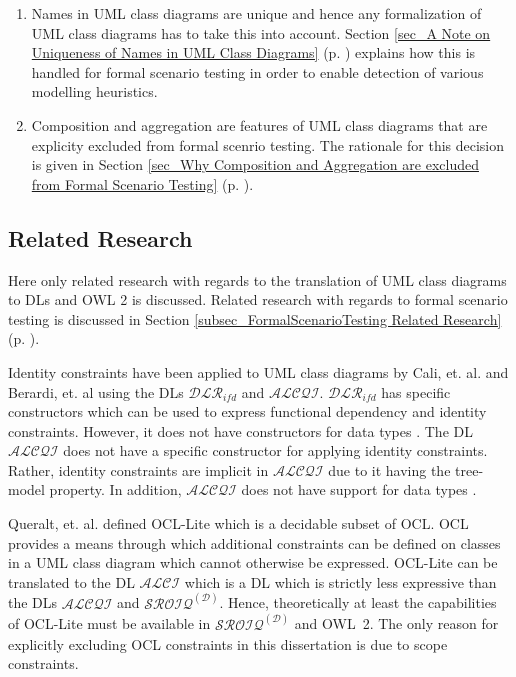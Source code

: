 \begin{enumerate}
 \item Names in UML class diagrams are unique and hence any formalization of UML class diagrams has to take this into account. Section \ref{sec_A Note on Uniqueness of Names in UML Class Diagrams} 
 (p. \pageref{sec_A Note on Uniqueness of Names in UML Class Diagrams}) explains how this is handled for formal scenario testing in order to enable detection of various modelling 
 heuristics.
 \item Composition and aggregation are features of UML class diagrams that are explicity excluded from formal scenrio testing. The rationale for this decision is given in Section
 \ref{sec_Why Composition and Aggregation are excluded from Formal Scenario Testing} (p. \pageref{sec_Why Composition and Aggregation are excluded from Formal Scenario Testing}).
\end{enumerate}


\subsection{Related Research} \label{subsec_DLTranslationFormalScenrioTesting_Related Research}
Here only related research with regards to the translation of UML class diagrams to DLs and OWL 2 is discussed. Related research with regards to formal scenario testing is discussed in 
Section \ref{subsec_FormalScenarioTesting Related Research}
(p. \pageref{subsec_FormalScenarioTesting Related Research}).

Identity constraints have been applied to UML class diagrams by Cali, et. al. \cite{Cali2001} and Berardi, et. al \cite{Berardi2005} using the DLs $\mathcal{DLR}_{ifd}$ and $\mathcal{ALCQI}$. 
$\mathcal{DLR}_{ifd}$ has specific constructors which can be used to express functional dependency and identity constraints. However, it does not have constructors for
data types \cite{Cali2001,Berardi2005}. The DL $\mathcal{ALCQI}$ does not have a specific constructor for applying identity constraints. Rather, identity constraints are implicit in $\mathcal{ALCQI}$
due to it having the tree-model property. In addition, $\mathcal{ALCQI}$ does not have support for data types \cite{Berardi2005}.

Queralt, et. al. \cite{Queralt2012} defined OCL-Lite which is a decidable subset of OCL. OCL provides a means through which additional constraints can be defined on classes in a UML class diagram
which cannot otherwise be expressed.
OCL-Lite can be translated to the DL $\mathcal{ALCI}$ which is a DL which is strictly less expressive than 
the DLs $\mathcal{ALCQI}$ and $\mathcal{SROIQ}^{(\mathcal{D})}$. Hence, theoretically at least the capabilities of OCL-Lite must be available in $\mathcal{SROIQ}^{(\mathcal{D})}$ and OWL~2. 
The only reason for explicitly excluding OCL constraints in this dissertation is due to scope constraints. 


